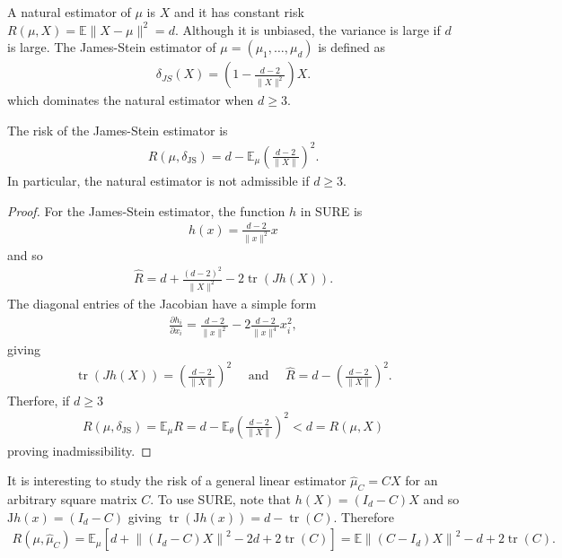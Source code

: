 A natural estimator of $\mu$ is $X$ and it has constant risk $R(\mu, X)= \mathbb{E}\|X-\mu\|^2=d$. Although it is unbiased, the variance is large if $d$ is large. The James-Stein estimator of $\mu=\left(\mu_1, \ldots, \mu_d\right)$ is defined as
\begin{align*}
\delta_{J S}(X)=\left(1-\frac{d-2}{\|X\|^2}\right) X .
\end{align*}
which dominates the natural estimator when $d\ge3$.
\begin{thm}
    The risk of the James-Stein estimator is
\begin{align*}
R\left(\mu, \delta_{\mathrm{JS}}\right)=d-\mathbb{E}_\mu\left(\frac{d-2}{\|X\|}\right)^2 .
\end{align*}
In particular, the natural estimator is not admissible if $d \geq 3$.
\end{thm}
\begin{proof}
    For the James-Stein estimator, the function $h$ in SURE is
\begin{align*}
h(x)=\frac{d-2}{\|x\|^2} x
\end{align*}
and so
\begin{align*}
\hat{R}=d+\frac{(d-2)^2}{\|X\|^2}-2 \operatorname{tr}(J h(X)) .
\end{align*}
The diagonal entries of the Jacobian have a simple form
\begin{align*}
\frac{\partial h_i}{\partial x_i}=\frac{d-2}{\|x\|^2}-2 \frac{d-2}{\|x\|^4} x_i^2,
\end{align*}
giving
\begin{align*}
\operatorname{tr}(J h(X))=\left(\frac{d-2}{\|X\|}\right)^2 \quad \text { and } \quad \hat{R}=d-\left(\frac{d-2}{\|X\|}\right)^2 .
\end{align*}
Therfore, if $d \geq 3$
\begin{align*}
R\left(\mu, \delta_{\mathrm{JS}}\right)=\mathbb{E}_\mu R=d-\mathbb{E}_\theta\left(\frac{d-2}{\|X\|}\right)^2<d=R(\mu, X)
\end{align*}
proving inadmissibility.
\end{proof}


It is interesting to study the risk of a general linear estimator $\widehat{\mu}_C= C X$ for an arbitrary square matrix $C$. To use SURE, note that $h(X)= \left(I_d-C\right) X$ and so $\mathrm{J} h(x)=\left(I_d-C\right)$ giving $\operatorname{tr}(\mathrm{J} h(x))=d-\operatorname{tr}(C)$.
Therefore
\begin{align*}
R\left(\mu, \widehat{\mu}_C\right)=\mathbb{E}_\mu\left[d+\left\|\left(I_d-C\right) X\right\|^2-2 d+2 \operatorname{tr}(C)\right]=\mathbb{E}\left\|\left(C-I_d\right) X\right\|^2-d+2 \operatorname{tr}(C) .
\end{align*}


